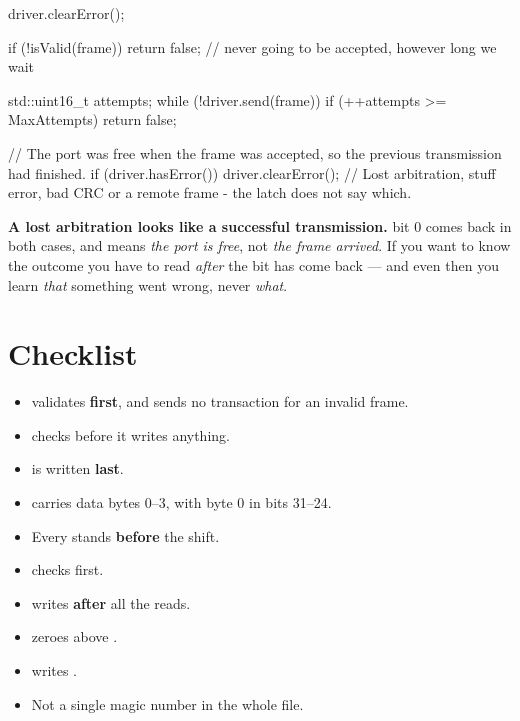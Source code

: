 \begin{cppcode}
driver.clearError();

if (!isValid(frame)) { return false; }   // never going to be accepted, however long we wait

std::uint16_t attempts{};
while (!driver.send(frame))
{
    if (++attempts >= MaxAttempts) { return false; }
}

// The port was free when the frame was accepted, so the previous transmission had finished.
if (driver.hasError())
{
    driver.clearError();
    // Lost arbitration, stuff error, bad CRC or a remote frame - the latch does not say which.
}
\end{cppcode}

\begin{limitation}
\textbf{A lost arbitration looks like a successful transmission.}  bit 0 comes back
in both cases, and means \emph{the port is free}, not \emph{the frame arrived}. If you want to
know the outcome you have to read  \emph{after} the bit has come back --- and
even then you learn \emph{that} something went wrong, never \emph{what}.
\end{limitation}

\section{Checklist}
\label{sec:checklist}

\begin{itemize}
  \item[\checkbox]  validates \textbf{first}, and sends no transaction for an invalid
    frame.
  \item[\checkbox]  checks  before it writes anything.
  \item[\checkbox]  is written \textbf{last}.
  \item[\checkbox]  carries data bytes 0--3, with byte 0 in bits 31--24.
  \item[\checkbox] Every  stands \textbf{before} the shift.
  \item[\checkbox]  checks  first.
  \item[\checkbox]  writes  \textbf{after} all the reads.
  \item[\checkbox]  zeroes  above .
  \item[\checkbox]  writes .
  \item[\checkbox] Not a single magic number in the whole file.
\end{itemize}
